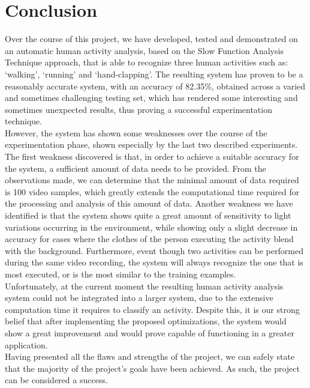 \documentclass[11pt]{report}
\begin{document}

\clearpage

\chapter{Conclusion}
Over the course of this project, we have developed, tested and demonstrated on an automatic human activity analysis, based on the Slow Function Analysis Technique \cite{main} approach, that is able to recognize three human activities such as: `walking', `running' and `hand-clapping'. The resulting system has proven to be a reasonably accurate system, with an accuracy of 82.35\%, obtained across a varied and sometimes challenging testing set, which has rendered some interesting and sometimes unexpected results, thus proving a successful experimentation technique. \\
However, the system has shown some weaknesses over the course of the experimentation phase, shown especially by the last two described experiments. The first weakness discovered is that, in order to achieve a suitable accuracy for the system, a sufficient amount of data needs to be provided. From the observations made, we can determine that the minimal amount of data required is 100 video samples, which greatly extends the computational time required for the processing and analysis of this amount of data. Another weakness we have identified is that the system shows quite a great amount of sensitivity to light variations occurring in the environment, while showing only a slight decrease in accuracy for cases where the clothes of the person executing the activity blend with the background. Furthermore, event though two activities can be performed during the same video recording, the system will always recognize the one that is most executed, or is the most similar to the training examples.\\
Unfortunately, at the current moment the resulting human activity analysis system could not be integrated into a larger system, due to the extensive computation time it requires to classify an activity. Despite this, it is our strong belief that after implementing the proposed optimizations, the system would show a great improvement and would prove capable of functioning in a greater application. \\
Having presented all the flaws and strengths of the project, we can safely state that the majority of the project's goals have been achieved. As such, the project can be considered a success. \\
\end{document}
